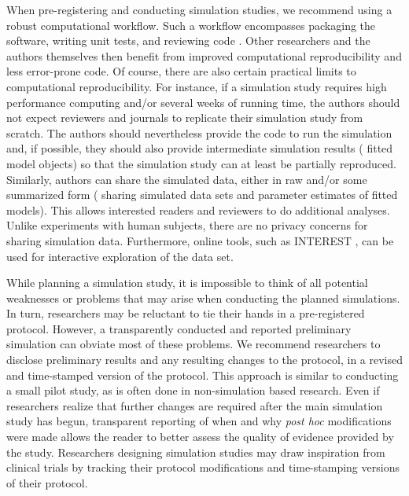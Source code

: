 \documentclass[a4paper, 11pt]{article}
\begin{document}
When pre-registering and conducting simulation studies, we recommend using a
robust computational workflow. Such a workflow encompasses packaging the software, 
writing unit tests, and reviewing code \citep[see \eg{}][]{schwab2021statistical}. 
Other researchers and the authors themselves then benefit from improved computational
reproducibility and less error-prone code. 
Of course, there are also certain practical limits to computational
reproducibility. For instance, if a simulation study requires high performance
computing and/or several weeks of running time, the authors should not expect 
reviewers and journals to replicate their simulation study from scratch. The authors
should nevertheless provide the code to run the simulation and, if possible, they should also provide 
intermediate simulation results (\eg{} fitted model objects) so that
the simulation study can at least be partially reproduced. Similarly,
authors can share the simulated data, 
either in raw and/or some summarized form (\eg{} sharing simulated data 
sets and parameter estimates of fitted models).
This allows interested readers and reviewers to do additional analyses. 
Unlike experiments with human subjects, there are no privacy concerns for
sharing simulation data. Furthermore, online tools, such as INTEREST
\citep[INteractive Tool for Exploring REsults from Simulation
sTudies,][]{Gasparini2021}, can be used for interactive exploration of the data 
set.

While planning a simulation study, it is impossible to think of all potential 
weaknesses or problems that may arise when conducting the planned simulations. 
In turn, researchers may be reluctant to tie their hands in a pre-registered protocol.
However, a transparently conducted and reported preliminary simulation can obviate most 
of these problems. We recommend researchers to disclose preliminary results and any resulting 
changes to the protocol, \eg{} in a revised and time-stamped version of the protocol. 
This approach is similar to conducting a small pilot study, as is often done in non-simulation based 
research. Even if researchers realize that further changes are required after the main simulation 
study has begun, transparent reporting of when and why \emph{post hoc} modifications were made allows
the reader to better assess the quality of evidence provided by the study.
Researchers designing simulation studies may draw inspiration from clinical 
trials by tracking their protocol modifications and time-stamping versions of their 
protocol.
\end{document}
